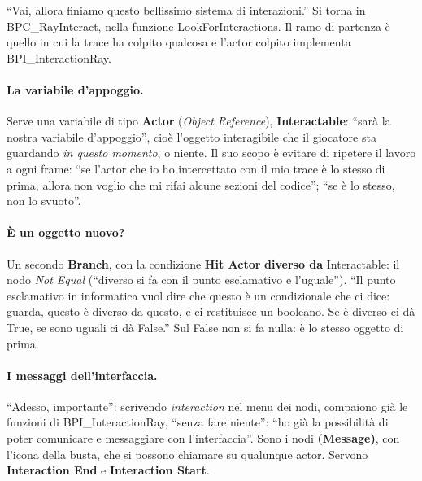 ``Vai, allora finiamo questo bellissimo sistema di interazioni.'' Si torna in
BPC\_RayInteract, nella funzione LookForInteractions. Il ramo di partenza è quello in cui
la trace ha colpito qualcosa e l'actor colpito implementa BPI\_InteractionRay.

\paragraph{La variabile d'appoggio.} Serve una variabile di tipo \textbf{Actor}
(\emph{Object Reference}), \textbf{Interactable}: ``sarà la nostra variabile d'appoggio'',
cioè l'oggetto interagibile che il giocatore sta guardando \emph{in questo momento}, o
niente. Il suo scopo è evitare di ripetere il lavoro a ogni frame: ``se l'actor che io ho
intercettato con il mio trace è lo stesso di prima, allora non voglio che mi rifai alcune
sezioni del codice''; ``se è lo stesso, non lo svuoto''.

\paragraph{È un oggetto nuovo?} Un secondo \textbf{Branch}, con la condizione \textbf{Hit
Actor} \textbf{diverso da} Interactable: il nodo \emph{Not Equal} (``diverso si fa con il
punto esclamativo e l'uguale''). ``Il punto esclamativo in informatica vuol dire che questo è
un condizionale che ci dice: guarda, questo è diverso da questo, e ci restituisce un
booleano. Se è diverso ci dà True, se sono uguali ci dà False.'' Sul False non si fa nulla:
è lo stesso oggetto di prima.

\paragraph{I messaggi dell'interfaccia.} ``Adesso, importante'': scrivendo
\emph{interaction} nel menu dei nodi, compaiono già le funzioni di BPI\_InteractionRay,
``senza fare niente'': ``ho già la possibilità di poter comunicare e messaggiare con
l'interfaccia''. Sono i nodi \textbf{(Message)}, con l'icona della busta, che si possono
chiamare su qualunque actor. Servono \textbf{Interaction End} e \textbf{Interaction Start}.

